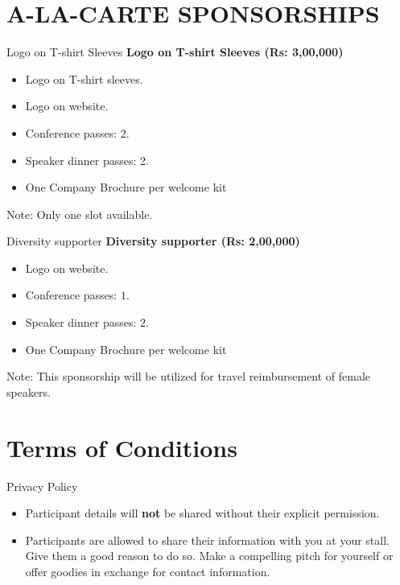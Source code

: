 \documentclass[10pt, compress, aspectratio=169]{beamer}
\begin{document}
\section{A-LA-CARTE SPONSORSHIPS}
\begin{frame}{Logo on T-shirt Sleeves}
\textbf{Logo on T-shirt Sleeves (Rs: 3,00,000)}
\begin{itemize}
    \item Logo on T-shirt sleeves.
    \item Logo on website.
    \item Conference passes: 2.
    \item Speaker dinner passes: 2.
    \item One Company Brochure per welcome kit
\end{itemize}
\begin{tiny}
    Note: Only one slot available.
\end{tiny}
    
\end{frame}




\begin{frame}{Diversity supporter}
\textbf{Diversity supporter (Rs: 2,00,000)}
\begin{itemize}
    \item Logo on website.
    \item Conference passes: $1$.
    \item Speaker dinner passes: $2$.
    \item One Company Brochure per welcome kit
\end{itemize}
\begin{tiny}
    Note: This sponsorship will be utilized for travel reimbursement of female speakers.
\end{tiny}
    
\end{frame}


\section{Terms of Conditions}
\begin{frame}{Privacy Policy}
    \begin{itemize}
        \item Participant details will \textbf{not} be shared without their explicit permission.
        \item Participants are allowed to share their information with you at your stall. Give them a good reason to do so. Make a compelling pitch for yourself or offer goodies in exchange for contact information.
    \end{itemize}
\end{frame}
\end{document}

